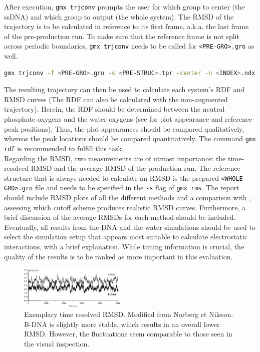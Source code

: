 \documentclass[9pt,tutorial]{livecoms}
\newcommand{\code}[1]{\colorbox{light-gray}{\texttt{#1}}}
\begin{document}
After execution, \code{gmx trjconv} prompts the user for which group to center (the ssDNA) and which group to output (the whole system). The RMSD of the trajectory is to be calculated in reference to its first frame, a.k.a. the last frame of the pre-production run. To make sure that the reference frame is not split across periodic boundaries, \code{gmx trjconv} needs to be called for \texttt{<PRE-GRO>.gro} as well.
\begin{lstlisting}[language=bash]
gmx trjconv -f <PRE-GRO>.gro -s <PRE-STRUC>.tpr -center -n <INDEX>.ndx -pbc mol -o <WHOLE-GRO>.gro
\end{lstlisting}
The resulting trajectory can then be used to calculate each system's RDF and RMSD curves (The RDF can also be calculated with the non-augmented trajectory). Herein, the RDF should be determined between the neutral phosphate oxygens and the water oxygens (see  for plot appearance and reference peak positions). Thus, the plot appearances should be compared qualitatively, whereas the peak locations should be compared quantitatively. The command \code{gmx rdf} is recommended to fulfill this task.\\
Regarding the RMSD, two measurements are of utmost importance: the time-resolved RMSD and the average RMSD of the production run. The reference structure that is always needed to calculate an RMSD is the prepared \code{<WHOLE-GRO>.gro} file and needs to be specified in the \code{-s} flag of \code{gmx rms}. The report should include RMSD plots of all the different methods and a comparison with , assessing which cutoff scheme produces realistic RMSD curves. Furthermore, a brief discussion of the average RMSDs for each method should be included.\\
Eventually, all results from the DNA and the water simulations should be used to select the simulation setup that appears most suitable to calculate electrostatic interactions, with a brief explanation. While timing information is crucial, the quality of the results is to be ranked as more important in this evaluation.
\begin{figure}[H]
    \centering
    \includegraphics[width=0.45\textwidth]{figures/DNA_RMSD.png}
    \caption[Exemplary time resolved RMSD]{Exemplary time resolved RMSD. Modified from Norberg et Nilsson.\cite{Norberg2000} B-DNA is slightly more stable, which results in an overall lower RMSD. However, the fluctuations seem comparable to those seen in the visual inspection.}
    \label{fig:DNARMSD}
\end{figure}
\end{document}
